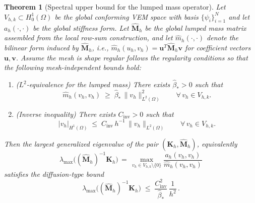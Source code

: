 \documentclass{article}
\newtheorem{theo}{Theorem}[section]
\begin{document}
\begin{theo}[Spectral upper bound for the lumped mass operator]\label{theo:lumped_spectral_bound}
Let $V_{h,k}\subset H^1_0(\Omega)$ be the global conforming VEM space with basis $\{\psi_i\}_{i=1}^N$ and let $a_h(\cdot,\cdot)$ be the global stiffness form. Let $\hat{\mathbf{M}}_h$ be the global lumped mass matrix assembled from the local row-sum construction, and let $\hat m_h(\cdot,\cdot)$ denote the bilinear form induced by $\hat{\mathbf{M}}_h$, i.e., $\hat m_h(u_h,v_h)=\mathbf{u}^T\hat{\mathbf{M}}_h\mathbf{v}$ for coefficient vectors $\mathbf{u},\mathbf{v}$. Assume the mesh is shape regular follows the regularity conditions so that the following mesh-independent bounds hold:
\begin{enumerate}
    \item[$(i)$] ($L^2$-equivalence for the lumped mass) There exists $\hat{\beta}_*>0$ such that
    \begin{equation}
    \nonumber
        \hat m_h(v_h,v_h) \;\ge\; \hat{\beta}_*\, \| v_h \|^2_{L^2(\Omega)} \qquad \forall\, v_h\in V_{h,k}.
    \end{equation}
    \item[$(ii)$] (Inverse inequality) There exists $C_{\mathrm{inv}}>0$ such that
    \begin{equation}
    \nonumber
        | v_h |_{H^1(\Omega)} \;\le\; C_{\mathrm{inv}}\, h^{-1}\, \| v_h \|_{L^2(\Omega)} \qquad \forall\, v_h\in V_{h,k}.
    \end{equation}
\end{enumerate}
Then the largest generalized eigenvalue of the pair $(\mathbf{K}_h,\hat{\mathbf{M}}_h)$, equivalently
\begin{equation}
    \nonumber
    \lambda_{\max}\!\big( (\hat{\mathbf{M}}_h)^{-1}\mathbf{K}_h \big)
    \,=\, \max_{v_h\in V_{h,k}\setminus\{0\}} \frac{a_h(v_h,v_h)}{\hat m_h(v_h,v_h)}
\end{equation}
satisfies the diffusion-type bound
\begin{equation}
    \nonumber
    \lambda_{\max}\!\big( (\hat{\mathbf{M}}_h)^{-1}\mathbf{K}_h \big) \;\le\; \frac{C_{\mathrm{inv}}^2}{\hat{\beta}_*}\, \frac{1}{h^{2}}\,.
\end{equation}
\end{theo}
\end{document}
